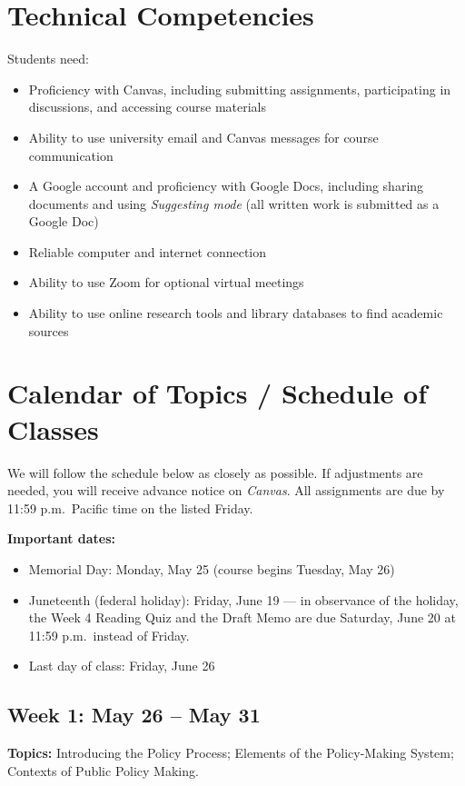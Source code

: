 \documentclass[12pt]{article}
\begin{document}
\section*{Technical Competencies}
Students need:
\begin{itemize}
\item Proficiency with Canvas, including submitting assignments, participating in discussions, and accessing course materials
\item Ability to use university email and Canvas messages for course communication
\item A Google account and proficiency with Google Docs, including sharing documents and using \emph{Suggesting mode} (all written work is submitted as a Google Doc)
\item Reliable computer and internet connection
\item Ability to use Zoom for optional virtual meetings
\item Ability to use online research tools and library databases to find academic sources
\end{itemize}

\section*{Calendar of Topics / Schedule of Classes}

We will follow the schedule below as closely as possible. If adjustments are needed, you will receive advance notice on \emph{Canvas}. All assignments are due by 11:59 p.m.\ Pacific time on the listed Friday.

\vspace{0.5em}
\noindent \textbf{Important dates:}
\begin{itemize}
    \item Memorial Day: Monday, May 25 (course begins Tuesday, May 26)
    \item Juneteenth (federal holiday): Friday, June 19 --- in observance of the holiday, the Week 4 Reading Quiz and the Draft Memo are due Saturday, June 20 at 11:59 p.m.\ instead of Friday.
    \item Last day of class: Friday, June 26
\end{itemize}

\bigskip

\subsection*{Week 1: May 26 -- May 31}
\noindent \textbf{Topics:} Introducing the Policy Process; Elements of the Policy-Making System; Contexts of Public Policy Making.
\end{document}
